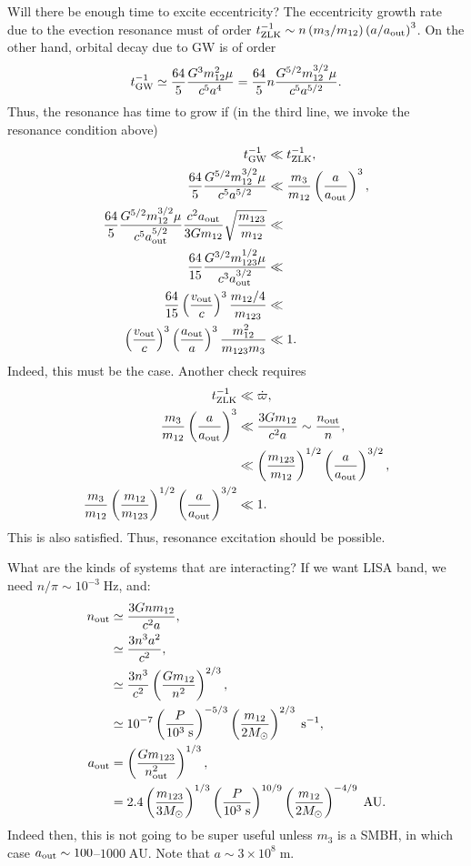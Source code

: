 \documentclass[11pt,
        usenames, %
        dvipsnames %
    ]{article}
\newcommand*{\scinot}[2]{#1\times10^{#2}}
\newcommand*{\p}[1]{\left(#1\right)}
\begin{document}
Will there be enough time to excite eccentricity? The eccentricity growth rate
due to the evection resonance must of order $t_{\rm ZLK}^{-1} \sim n \p{m_3 /
m_{12}} \p{a / a_{\rm out}}^3$. On the other hand, orbital decay due to GW is of
order
\begin{equation}
    t_{\rm GW}^{-1} \simeq \frac{64}{5}\frac{G^3m_{12}^2\mu}{c^5a^4}
        = \frac{64}{5}n\frac{G^{5/2}m_{12}^{3/2}\mu}{c^5a^{5/2}}.
\end{equation}
Thus, the resonance has time to grow if (in the third line, we invoke the
resonance condition above)
\begin{align}
    t_{\rm GW}^{-1} &\ll t_{\rm ZLK}^{-1},\\
    \frac{64}{5}\frac{G^{5/2}m_{12}^{3/2}\mu}{c^5a^{5/2}} &\ll
        \frac{m_3}{m_{12}}\p{\frac{a}{a_{\rm out}}}^3,\\
    \frac{64}{5}\frac{G^{5/2}m_{12}^{3/2}\mu}{c^5a_{\rm out}^{5/2}}
        \frac{c^2a_{\rm out}}{3Gm_{12}}\sqrt{\frac{m_{123}}{m_{12}}}
            &\ll\\
    \frac{64}{15} \frac{G^{3/2}m_{123}^{1/2}\mu}{c^3a_{\rm out}^{3/2}}&\ll\\
    \frac{64}{15}\p{\frac{v_{\rm out}}{c}}^3 \frac{m_{12} / 4}{m_{123}}
        &\ll\\
    \p{\frac{v_{\rm out}}{c}}^3\p{\frac{a_{\rm out}}{a}}^3
        \frac{m_{12}^2}{m_{123}m_3} &\ll 1.
\end{align}
Indeed, this must be the case. Another check requires
\begin{align}
    t_{\rm ZLK}^{-1} &\ll \dot{\varpi},\\
    \frac{m_3}{m_{12}}\p{\frac{a}{a_{\rm out}}}^3 &\ll \frac{3Gm_{12}}{c^2a}
        \sim \frac{n_{\rm out}}{n},\\
    &\ll \p{\frac{m_{123}}{m_{12}}}^{1/2}\p{\frac{a}{a_{\rm out}}}^{3/2},\\
    \frac{m_3}{m_{12}}\p{\frac{m_{12}}{m_{123}}}^{1/2}\p{\frac{a}{a_{\rm
        out}}}^{3/2} &\ll 1.
\end{align}
This is also satisfied. Thus, resonance excitation should be possible.

What are the kinds of systems that are interacting? If we want LISA band, we
need $n / \pi \sim 10^{-3}\;\mathrm{Hz}$, and:
\begin{align}
    n_{\rm out} &\simeq \frac{3Gnm_{12}}{c^2a},\\
        &\simeq \frac{3n^3a^2}{c^2},\\
        &\simeq \frac{3n^3}{c^2}\p{\frac{Gm_{12}}{n^2}}^{2/3},\\
        &\simeq 10^{-7}
            \p{\frac{P}{10^3\;\mathrm{s}}}^{-5/3}
            \p{\frac{m_{12}}{2 M_{\odot}}}^{2/3}\;\mathrm{s^{-1}},\\
    a_{\rm out} &= \p{\frac{Gm_{123}}{n_{\rm out}^2}}^{1/3},\\
        &= 2.4\p{\frac{m_{123}}{3 M_{\odot}}}^{1/3}
            \p{\frac{P}{10^3\;\mathrm{s}}}^{10/9}
            \p{\frac{m_{12}}{2M_{\odot}}}^{-4/9}\;\mathrm{AU}.
\end{align}
Indeed then, this is not going to be super useful unless $m_3$ is a SMBH, in
which case $a_{\rm out} \sim 100$--$1000\;\mathrm{AU}$. Note that $a \sim
\scinot{3}{8}\;\mathrm{m}$.
\end{document}
